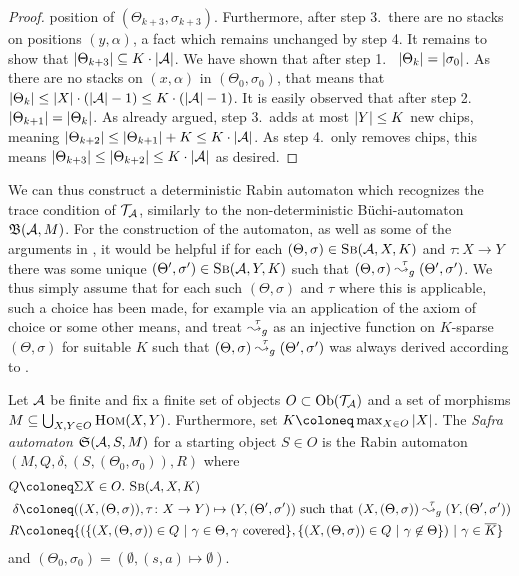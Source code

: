 \begin{proof}
  position of $(\Theta_{k + 3}, \sigma_{k + 3})$. Furthermore, after step 3.~there are no
  stacks on positions $(y, \alpha)$, a fact which remains unchanged by step 4.
  It remains to show that $|\Theta_{k + 3}| \subseteq K \cdot |\mathcal{A}|$.
  We have shown that after step 1.~ $|\Theta_k| = |\sigma_0|$. As
  there are no stacks on $(x, \alpha)$ in $(\Theta_0, \sigma_0)$, that
  means that $|\Theta_k| \leq |X| \cdot (|\mathcal{A}| - 1) \leq K \cdot
  (|\mathcal{A}| - 1)$. It is easily
  observed that after step 2.~$|\Theta_{k + 1}| = |\Theta_k|$. As
  already argued, step 3.~adds at most $|Y| \leq K$ new chips, meaning
  $|\Theta_{k + 2}| \leq |\Theta_{k + 1}| + K \leq K \cdot |\mathcal{A}|$. As
  step 4.~only removes chips, this means $|\Theta_{k + 3}| \leq |\Theta_{k +
      2}| \leq K \cdot |\mathcal{A}|$ as desired.
\end{proof}

We can thus construct a deterministic Rabin automaton which recognizes the trace
condition of $\mathcal{T}_{\mathcal{A}}$, similarly to the non-deterministic Büchi-automaton $\mathfrak{B}(\mathcal{A}, M)$.
For the construction of the automaton, as well as some of the arguments in
, it would be helpful if for each $(\Theta, \sigma) \in
\textsc{Sb}(\mathcal{A}, X, K)$ and $\tau \colon X \to Y$ there was some unique $(\Theta', \sigma')
\in \textsc{Sb}(\mathcal{A}, Y, K)$ such that $(\Theta, \sigma) \stackrel{\tau}{\leadsto_g} (\Theta',
\sigma')$. We thus simply assume that for each such
$(\Theta, \sigma)$ and $\tau$ where this is applicable, such a choice has been
made, for example via an application of the axiom of choice or some other means,
and treat $\stackrel{\tau}{\leadsto_g}$ as an injective function on $K$-sparse $(\Theta,
\sigma)$ for suitable $K$ such that $(\Theta, \sigma) \stackrel{\tau}{\leadsto_g} (\Theta',
\sigma')$ was always derived according to .

\begin{definition}\label{def:safra-aut}
  Let $\mathcal{A}$ be finite and fix a finite set of objects $O \subset \mathrm{Ob}(\mathcal{T}_{\mathcal{A}})$ and
  a set of morphisms $M \subseteq \bigcup_{X, Y \in O} \textsc{Hom}(X, Y)$. Furthermore,
  set $K \coloneq \max_{X \in O} \abs{X}$. The \emph{Safra
    automaton $\mathfrak{S}(\mathcal{A}, S, M)$} for a starting object $S \in O$ is the Rabin automaton $(M, Q,
  \delta, (S, (\Theta_0, \sigma_0)), R)$ where
  \begin{align*}
    Q & \coloneq \Sigma X \in O.~\Sb(\Aa, X, K) \\
    \delta & \coloneq ((X, (\Theta, \sigma)), \tau \colon X \to Y ) \mapsto (Y, (\Theta', \sigma')) \text{ such that } (X, (\Theta, \sigma)) \gstep{\tau} (Y, (\Theta', \sigma')) \\
    R & \coloneq \{(\{(X, (\Theta, \sigma)) \in Q ~|~ \gamma \in \Theta, \gamma \text{ covered}\}, \{(X, (\Theta, \sigma)) \in Q ~|~ \gamma \not\in \Theta\}) ~|~ \gamma \in \ol{K}\}
  \end{align*}
  and $(\Theta_0, \sigma_0) = (\emptyset, (s, a) \mapsto \emptyset)$.
\end{definition}

